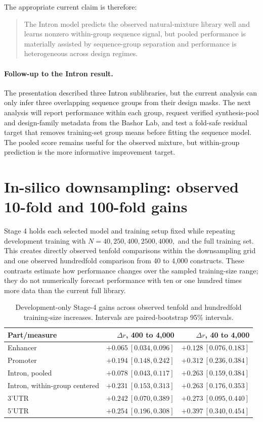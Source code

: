 \documentclass[11pt]{article}
\begin{document}
The appropriate current claim is therefore:

\begin{quote}
The Intron model predicts the observed natural-mixture library well and learns
nonzero within-group sequence signal, but pooled performance is materially
assisted by sequence-group separation and performance is heterogeneous across
design regimes.
\end{quote}

\paragraph{Follow-up to the Intron result.}
The presentation described three Intron sublibraries, but the current analysis
can only infer three overlapping sequence groups from their design masks. The
next analysis will report performance within each group, request verified
synthesis-pool and design-family metadata from the Bashor Lab, and test a
fold-safe residual target that removes training-set group means before fitting
the sequence model. The pooled score remains useful for the observed mixture,
but within-group prediction is the more informative improvement target.

\section{In-silico downsampling: observed 10-fold and 100-fold gains}

Stage 4 holds each selected model and training setup fixed while repeating
development training with $N=40,250,400,2500,4000,$ and the full training set.
This creates directly observed tenfold comparisons within the downsampling grid
and one observed hundredfold comparison from 40 to 4,000 constructs. These
contrasts estimate how performance changes over the sampled training-size
range; they do not numerically forecast performance with ten or one hundred
times more data than the current full library.

\begin{table}[H]
\centering
\caption{Development-only Stage-4 gains across observed tenfold and hundredfold
training-size increases. Intervals are paired-bootstrap 95\% intervals.}
\label{tab:stage4}
\small
\begin{tabular}{lrr}
\toprule
Part/measure & $\Delta r$, 400 to 4,000 & $\Delta r$, 40 to 4,000 \\
\midrule
Enhancer & $+0.065\ [0.034,0.096]$ & $+0.128\ [0.076,0.183]$ \\
Promoter & $+0.194\ [0.148,0.242]$ & $+0.312\ [0.236,0.384]$ \\
Intron, pooled & $+0.078\ [0.043,0.117]$ & $+0.263\ [0.159,0.384]$ \\
Intron, within-group centered & $+0.231\ [0.153,0.313]$ & $+0.263\ [0.176,0.353]$ \\
3'UTR & $+0.242\ [0.070,0.389]$ & $+0.273\ [0.095,0.440]$ \\
5'UTR & $+0.254\ [0.196,0.308]$ & $+0.397\ [0.340,0.454]$ \\
\bottomrule
\end{tabular}
\end{table}
\end{document}
